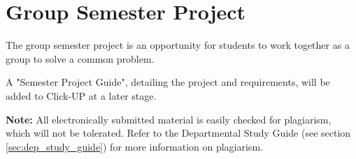 \section{Group Semester Project}
        The group semester project is an opportunity for students to work
        together as a group to solve a common problem.

        A "Semester Project Guide", detailing the project and requirements,
        will be added to Click-UP at a later stage.

        \textbf{Note:} All electronically submitted material is easily
        checked for plagiarism, which will not be tolerated. Refer to the
        Departmental Study Guide (see section \ref{sec:dep_study_guide}) for
        more information on plagiarism.

